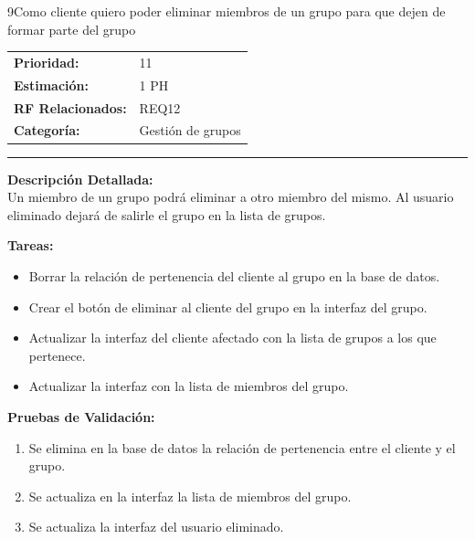 \begin{hu_card}{9}{Como cliente quiero poder eliminar miembros de un grupo para que dejen de formar parte del grupo}
    \begin{tabularx}{\linewidth}{l X}
        \textbf{Prioridad:}   & 11 \\
        \textbf{Estimación:}  & 1 PH \\
        \textbf{RF Relacionados:} & REQ12 \\
        \textbf{Categoría:} & Gestión de grupos \\
    \end{tabularx}

    \vspace{2mm}
    \hrule
    \vspace{2mm}

    \textbf{Descripción Detallada:} \\
    Un miembro de un grupo podrá eliminar a otro miembro del mismo. Al usuario eliminado dejará de salirle el grupo en la lista de grupos.

    \vspace{2mm}
    \textbf{Tareas:}
    \begin{itemize}[noitemsep, topsep=0pt]
        \item Borrar la relación de pertenencia del cliente al grupo en la base de datos.
        \item Crear el botón de eliminar al cliente del grupo en la interfaz del grupo.
        \item Actualizar la interfaz del cliente afectado con la lista de grupos a los que pertenece.
        \item Actualizar la interfaz con la lista de miembros del grupo.
    \end{itemize}

    \vspace{2mm}
    \textbf{Pruebas de Validación:}
    \begin{enumerate}[noitemsep, topsep=0pt]
        \item Se elimina en la base de datos la relación de pertenencia entre el cliente y el grupo.
        \item Se actualiza en la interfaz la lista de miembros del grupo.
        \item Se actualiza la interfaz del usuario eliminado.
    \end{enumerate}
\end{hu_card}

